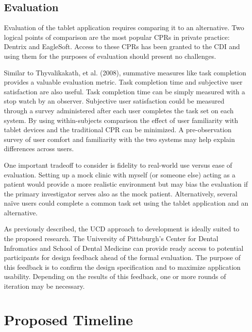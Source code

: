 \documentclass[11pt]{article}
\begin{document}
\subsection{Evaluation}

Evaluation of the tablet application requires comparing it to an alternative. Two logical points of comparison are the most popular CPRs in private practice: Dentrix and EagleSoft. Access to these CPRs has been granted to the CDI and using them for the purposes of evaluation should present no challenges.

Similar to Thyvalikakath, et al. (2008), summative measures like task completion provides a valuable evaluation metric. Task completion time and subjective user satisfaction are also useful\cite{Chin1998Development-of-}. Task completion time can be simply measured with a stop watch by an observer. Subjective user satisfaction could be measured through a survey administered after each user completes the task set on each system. By using within-subjects comparison the effect of user familiarity with tablet devices and the traditional CPR can be minimized. A pre-observation survey of user comfort and familiarity with the two systems may help explain differences across users. 

One important tradeoff to consider is fidelity to real-world use versus ease of evaluation. Setting up a mock clinic with myself (or someone else) acting as a patient would provide a more realistic environment but may bias the evaluation if the primary investigator serves also as the mock patient. Alternatively, several na\"{i}ve users could complete a common task set using the tablet application and an alternative.

As previously described, the UCD approach to development is ideally suited to the proposed research. The University of Pittsburgh's Center for Dental Infromatics and School of Dental Medicine can provide ready access to potential participants for design feedback ahead of the formal evaluation. The purpose of this feedback is to confirm the design specification and to maximize application usability. Depending on the results of this feedback, one or more rounds of iteration may be necessary.  

\section{Proposed Timeline}
\end{document}

